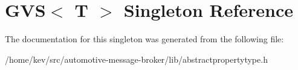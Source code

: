 \hypertarget{singletonGVS}{\section{G\+V\+S$<$ T $>$ Singleton Reference}
\label{singletonGVS}
}


The documentation for this singleton was generated from the following file\+:\begin{DoxyCompactItemize}
\item 
/home/kev/src/automotive-\/message-\/broker/lib/abstractpropertytype.\+h\end{DoxyCompactItemize}
